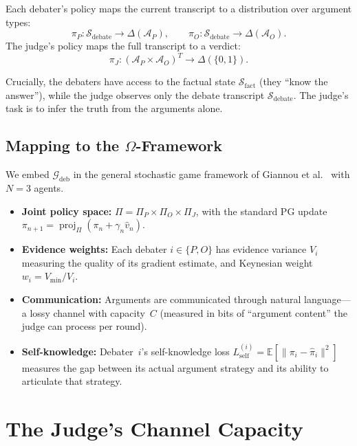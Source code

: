 \documentclass[11pt,a4paper]{article}
\DeclareMathOperator{\proj}{proj}
\newcommand{\E}{\mathbb{E}}
\newcommand{\cG}{\mathcal{G}}
\newcommand{\cS}{\mathcal{S}}
\newcommand{\cA}{\mathcal{A}}
\newcommand{\norm}[1]{\|#1\|}
\newcommand{\Lself}{L_{\text{self}}}
\begin{document}
Each debater's policy maps the current transcript to a distribution
over argument types:
\begin{equation}
    \pi_P : \cS_{\text{debate}} \to \Delta(\cA_P), \qquad
    \pi_O : \cS_{\text{debate}} \to \Delta(\cA_O).
\end{equation}
The judge's policy maps the full transcript to a verdict:
\begin{equation}
    \pi_J : (\cA_P \times \cA_O)^T \to \Delta(\{0, 1\}).
\end{equation}

Crucially, the debaters have access to the factual state
$\cS_{\text{fact}}$ (they ``know the answer''), while the judge observes
only the debate transcript $\cS_{\text{debate}}$. The judge's task is
to infer the truth from the arguments alone.

\subsection{Mapping to the $\Omega$-Framework}

We embed $\cG_{\text{deb}}$ in the general stochastic game framework
of Giannou et al.\ \cite{giannou2022} with $N = 3$ agents.

\begin{itemize}
    \item \textbf{Joint policy space:} $\Pi = \Pi_P \times \Pi_O \times \Pi_J$,
    with the standard PG update
    $\pi_{n+1} = \proj_\Pi(\pi_n + \gamma_n \hat{v}_n)$.
    \item \textbf{Evidence weights:} Each debater $i \in \{P, O\}$ has
    evidence variance $V_i$ measuring the quality of its gradient
    estimate, and Keynesian weight $w_i = V_{\min}/V_i$.
    \item \textbf{Communication:} Arguments are communicated through natural
    language---a lossy channel with capacity~$C$ (measured in bits of
    ``argument content'' the judge can process per round).
    \item \textbf{Self-knowledge:} Debater~$i$'s self-knowledge loss
    $\Lself^{(i)} = \E[\norm{\pi_i - \hat{\pi}_i}^2]$ measures the
    gap between its actual argument strategy and its ability to articulate
    that strategy.
\end{itemize}


\section{The Judge's Channel Capacity}
\label{sec:channel}
\end{document}

